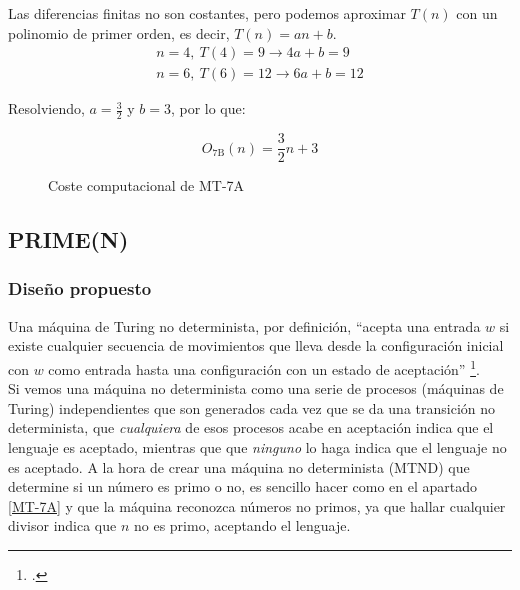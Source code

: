 Las diferencias finitas no son costantes, pero podemos aproximar $T(n)$ con un polinomio de primer orden, es decir, $T(n) = an + b$.
\begin{subequations}
    \begin{gather*}
        n = 4,\ T(4) = 9  \rightarrow 4a + b = 9 \\
        n = 6,\ T(6) = 12 \rightarrow 6a + b = 12
    \end{gather*}
\end{subequations}


Resolviendo, $a=\frac{3}{2}$ y $b=3$, por lo que:

\begin{equation}
    O_{\mathrm{7B}}(n) = \frac{3}{2}n + 3
\end{equation}


\begin{figure}[H]
    \centering
    
    \caption{Coste computacional de MT-7A}
\end{figure}



\subsection{PRIME(N)}

\subsubsection*{Diseño propuesto}
Una máquina de Turing no determinista, por definición, ``acepta una
entrada $w$ si existe cualquier secuencia de movimientos que lleva desde la configuración inicial con $w$ como entrada hasta una configuración con un estado de aceptación''
\footcite[ver][pg. 289]{HopcroftJohnE.2008Ialt}.\\
Si vemos una máquina no determinista como una serie de procesos (máquinas de Turing) independientes que son generados cada vez que se da una transición no determinista, que \textit{cualquiera} de esos procesos acabe en aceptación indica que el lenguaje es aceptado, mientras que que \textit{ninguno} lo haga indica que el lenguaje no es aceptado. A la hora de crear una máquina no determinista (MTND) que determine si un número es primo o no, es sencillo hacer como en el apartado \ref{MT-7A} y que la máquina reconozca números no primos, ya que hallar cualquier divisor indica que $n$ no es primo, aceptando el lenguaje.\medskip

